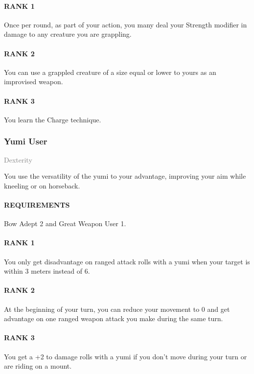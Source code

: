 \paragraph{RANK 1} Once per round, as part of your action, you many deal your Strength modifier in damage to any creature you are grappling.
\paragraph{RANK 2} You can use a grappled creature of a size equal or lower to yours as an improvised weapon.
\paragraph{RANK 3} You learn the Charge technique.

\subsubsection{Yumi User} \label{feat::yumiuser}
\small{\textcolor{gray}{Dexterity}}

\normalsize
You use the versatility of the yumi to your advantage, improving your aim while kneeling or on horseback.
\paragraph{REQUIREMENTS} Bow Adept 2 and Great Weapon User 1.
\paragraph{RANK 1} You only get disadvantage on ranged attack rolls with a yumi when your target is within 3 meters instead of 6.
\paragraph{RANK 2} At the beginning of your turn, you can reduce your movement to 0 and get advantage on one ranged weapon attack you make during the same turn.
\paragraph{RANK 3} You get a +2 to damage rolls with a yumi if you don't move during your turn or are riding on a mount.


